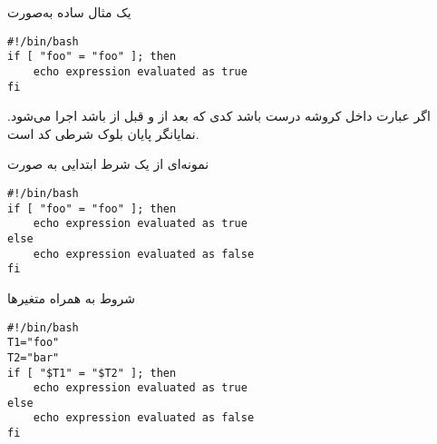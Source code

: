 \begin{example}{یک مثال ساده به‌صورت }
\begin{latin}
\begin{lstlisting}
#!/bin/bash
if [ "foo" = "foo" ]; then
	echo expression evaluated as true
fi
\end{lstlisting}
\end{latin}
اگر عبارت داخل کروشه درست باشد کدی که بعد از  و قبل از  باشد اجرا می‌شود.
 نمایانگر پایان بلوک شرطی کد است.
\end{example}

\begin{example}{نمونه‌ای از یک شرط ابتدایی به صورت }
\begin{latin}
\begin{lstlisting}
#!/bin/bash
if [ "foo" = "foo" ]; then
	echo expression evaluated as true
else
	echo expression evaluated as false
fi
\end{lstlisting}
\end{latin}
\end{example}

\begin{example}{شروط به همراه متغیر‌ها}
\begin{latin}
\begin{lstlisting}
#!/bin/bash
T1="foo"
T2="bar"
if [ "$T1" = "$T2" ]; then
	echo expression evaluated as true
else
	echo expression evaluated as false
fi
\end{lstlisting}
\end{latin}
\end{example}
